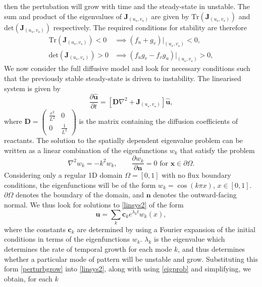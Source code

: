 then the pertubation will grow with time and the steady-state in unstable. The sum and product of the eigenvalues of $\textbf{J}_{(u_\star,v_\star)}$
are given by $\text{Tr}(\textbf{J}_{(u_\star,v_\star)})$ and $\text{det}(\textbf{J}_{(u_\star,v_\star)})$ respectively. The required conditions for stability are therefore
\begin{equation}\label{cond1}
    \begin{split}
\text{Tr}(\textbf{J}_{(u_\star,v_\star)})<0 &\implies (f_u+g_v)\big|_{(u_\star,v_\star)}<0, \\
\text{det}(\textbf{J}_{(u_\star,v_\star)})>0 &\implies (f_ug_v-f_vg_u)\big|_{(u_\star,v_\star)}>0,
\end{split}
\end{equation}
We now consider the full diffusive model and look for necessary conditions such that the previously stable steady-state is driven to instability. The linearised system is given by
\begin{equation}\label{linsys2}
    \frac{\partial \hat{\textbf{u}}}{\partial t}=\left[\textbf{D}\nabla^2+\textbf{J}_{(u_\star,v_\star)} \right]\hat{\textbf{u}},
\end{equation}
where $\textbf{D}=\begin{pmatrix}\frac{\epsilon^2}{L^2}&0\\0&\frac{1}{L^2}\end{pmatrix}$ is the matrix containing the diffusion coefficients of reactants.
The solution to the spatially dependent eigenvalue problem can be written as a linear combination of the eigenfunctions $w_k$ that satisfy the problem
\begin{equation}\label{eigprob}
\nabla^2w_k=-k^2w_k,\quad \quad \frac{\partial w_k}{\partial \textbf{n}}=0\text{ for } \textbf{x}\in\partial\Omega.
\end{equation}
Considering only a regular 1D domain $\Omega=[0,1]$ with no flux boundary conditions, the eigenfunctions will be of the form $w_k=\cos(k\pi x)$, $x\in[0,1]$. $\partial\Omega$ denotes the boundary of the domain, and $\textbf{n}$ denotes the outward-facing normal.
We thus look for solutions to \eqref{linsys2} of the form
\begin{equation}\label{perturbgrow}
    \hat{\textbf{u}}=\sum_k \textbf{c}_ke^{\lambda_k t}w_k(x),
\end{equation}
where the constants $\textbf{c}_k$ are determined by using a Fourier expansion of the initial conditions in terms of the eigenfunctions $w_k$. $\lambda_k$ is the eigenvalue which determines the rate of temporal growth for each mode $k$, and thus determines whether a particular mode of pattern will be unstable and grow. Substituting this form \eqref{perturbgrow} into \eqref{linsys2}, along with using \eqref{eigprob} and simplifying, we obtain, for each $k$
